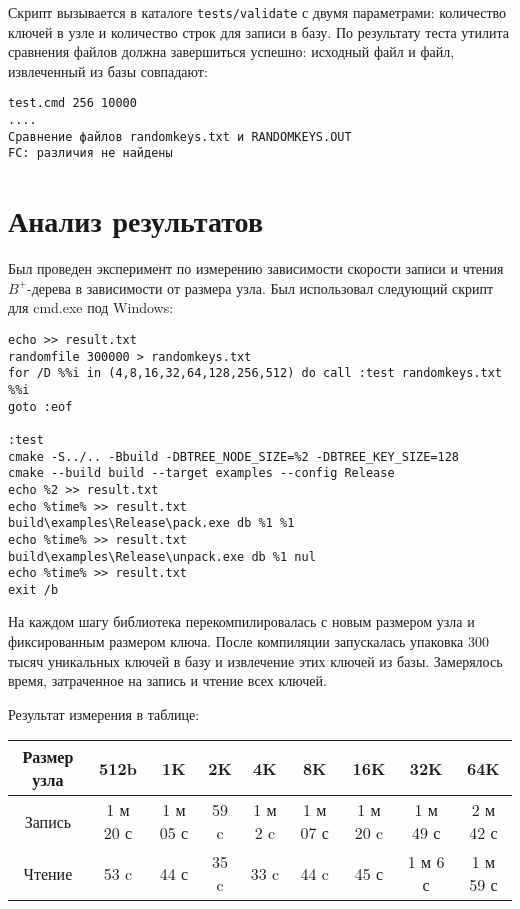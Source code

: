 \documentclass[14pt, russian]{scrartcl}
\begin{document}
Скрипт вызывается в каталоге \texttt{tests/validate} с двумя параметрами: количество ключей в узле и количество строк для записи в базу. По результату теста утилита сравнения файлов должна завершиться успешно: исходный файл и файл, извлеченный из базы совпадают:

\begin{verbatim}
test.cmd 256 10000
....
Сравнение файлов randomkeys.txt и RANDOMKEYS.OUT
FC: различия не найдены
\end{verbatim}


\section{Анализ результатов}
Был проведен эксперимент по измерению зависимости скорости записи и чтения $B^+$-дерева в зависимости от размера узла. Был использовал следующий скрипт для cmd.exe под Windows:

\begin{verbatim}
echo >> result.txt
randomfile 300000 > randomkeys.txt
for /D %%i in (4,8,16,32,64,128,256,512) do call :test randomkeys.txt %%i
goto :eof

:test
cmake -S../.. -Bbuild -DBTREE_NODE_SIZE=%2 -DBTREE_KEY_SIZE=128
cmake --build build --target examples --config Release
echo %2 >> result.txt
echo %time% >> result.txt
build\examples\Release\pack.exe db %1 %1
echo %time% >> result.txt
build\examples\Release\unpack.exe db %1 nul
echo %time% >> result.txt
exit /b
\end{verbatim}

На каждом шагу библиотека перекомпилировалась с новым размером узла и фиксированным размером ключа. После компиляции запускалась упаковка 300 тысяч уникальных ключей в базу и извлечение этих ключей из базы. Замерялось время, затраченное на запись и чтение всех ключей. 

Результат измерения в таблице:

\begin{table}[htbp]
  \begin{tabular}{|c|c|c|c|c|c|c|c|c|}
    \hline
     Размер узла & 512b & 1K & 2K & 4K & 8K & 16K & 32K & 64K\\
    \hline
     Запись & 1 м 20 с & 1 м 05 с & 59 c & 1 м 2 c & 1 м 07 с & 1 м 20 c & 1 м 49 с & 2 м 42 с\\
    \hline
    Чтение & 53 c & 44 с & 35 c & 33 c & 44 c & 45 с & 1 м 6 с & 1 м 59 с  \\
    \hline
  \end{tabular}
\end{table}
\end{document}
